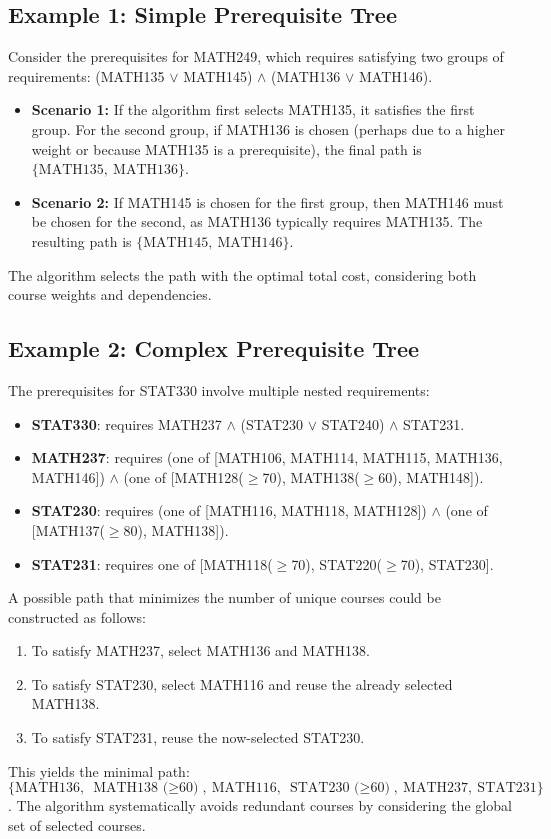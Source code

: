 \documentclass[11pt]{article}
\begin{document}
\subsection{Example 1: Simple Prerequisite Tree}

Consider the prerequisites for MATH249, which requires satisfying two groups of requirements: (MATH135 $\lor$ MATH145) $\land$ (MATH136 $\lor$ MATH146).
\begin{itemize}
    \item \textbf{Scenario 1:} If the algorithm first selects MATH135, it satisfies the first group. For the second group, if MATH136 is chosen (perhaps due to a higher weight or because MATH135 is a prerequisite), the final path is $\{\text{MATH135},\ \text{MATH136}\}$.
    \item \textbf{Scenario 2:} If MATH145 is chosen for the first group, then MATH146 must be chosen for the second, as MATH136 typically requires MATH135. The resulting path is $\{\text{MATH145},\ \text{MATH146}\}$.
\end{itemize}
The algorithm selects the path with the optimal total cost, considering both course weights and dependencies.

\subsection{Example 2: Complex Prerequisite Tree}

The prerequisites for STAT330 involve multiple nested requirements:
\begin{itemize}
    \item \textbf{STAT330}: requires MATH237 $\land$ (STAT230 $\lor$ STAT240) $\land$ STAT231.
    \item \textbf{MATH237}: requires (one of [MATH106, MATH114, MATH115, MATH136, MATH146]) $\land$ (one of [MATH128($\geq$70), MATH138($\geq$60), MATH148]).
    \item \textbf{STAT230}: requires (one of [MATH116, MATH118, MATH128]) $\land$ (one of [MATH137($\geq$80), MATH138]).
    \item \textbf{STAT231}: requires one of [MATH118($\geq$70), STAT220($\geq$70), STAT230].
\end{itemize}
A possible path that minimizes the number of unique courses could be constructed as follows:
\begin{enumerate}
    \item To satisfy MATH237, select MATH136 and MATH138.
    \item To satisfy STAT230, select MATH116 and reuse the already selected MATH138.
    \item To satisfy STAT231, reuse the now-selected STAT230.
\end{enumerate}
This yields the minimal path: $\{\text{MATH136},\ \text{MATH138 ($\geq$60)},\ \text{MATH116},\ \text{STAT230 ($\geq$60)},\ \text{MATH237},\ \text{STAT231}\}$. The algorithm systematically avoids redundant courses by considering the global set of selected courses.
\end{document}
